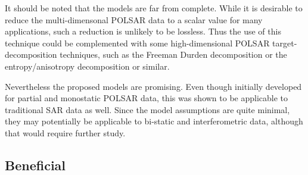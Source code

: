 It should be noted that the models are far from complete.
While it is desirable to reduce the multi-dimensonal POLSAR data to a scalar value for many applications,
  such a reduction is unlikely to be lossless.  
Thus %
the use of this technique could be complemented with some high-dimensional POLSAR target-decomposition techniques, such as the Freeman Durden decomposition \cite{Freeman_1998_TGRS_963} or the entropy/anisotropy decomposition \cite{Cloude_1997_TGRS_68} or similar.

Nevertheless the proposed models are promising.
Even though initially developed for partial and monostatic POLSAR data,
  this was shown to be applicable to traditional SAR data as well.
Since the model assumptions are quite minimal, they may potentially be applicable to bi-static and interferometric data, although that would require further study.

%
%

 \subsection{Beneficial}

